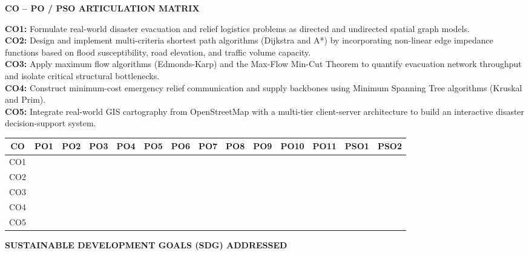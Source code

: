 \documentclass[12pt,oneside]{report}
\begin{document}
\thispagestyle{plain}
\begin{center}
\vspace{0.05in}
{\large\bfseries CO -- PO / PSO ARTICULATION MATRIX}
\end{center}
\textbf{CO1:} Formulate real-world disaster evacuation and relief logistics problems as directed and undirected spatial graph models.\\
\textbf{CO2:} Design and implement multi-criteria shortest path algorithms (Dijkstra and A*) by incorporating non-linear edge impedance functions based on flood susceptibility, road elevation, and traffic volume capacity.\\
\textbf{CO3:} Apply maximum flow algorithms (Edmonds-Karp) and the Max-Flow Min-Cut Theorem to quantify evacuation network throughput and isolate critical structural bottlenecks.\\
\textbf{CO4:} Construct minimum-cost emergency relief communication and supply backbones using Minimum Spanning Tree algorithms (Kruskal and Prim).\\
\textbf{CO5:} Integrate real-world GIS cartography from OpenStreetMap with a multi-tier client-server architecture to build an interactive disaster decision-support system.

\begin{center}
\begin{tabular}{|c|*{11}{c|}c|c|}
\hline
\textbf{CO}
& \textbf{PO1} & \textbf{PO2} & \textbf{PO3}
& \textbf{PO4} & \textbf{PO5} & \textbf{PO6}
& \textbf{PO7} & \textbf{PO8} & \textbf{PO9}
& \textbf{PO10} & \textbf{PO11}
& \textbf{PSO1} & \textbf{PSO2} \\ \hline

CO1 &  &  &  &  &  &  &  &  &  &  &  &  &  \\ \hline
CO2 &  &  &  &  &  &  &  &  &  &  &  &  &  \\ \hline
CO3 &  &  &  &  &  &  &  &  &  &  &  &  &  \\ \hline
CO4 &  &  &  &  &  &  &  &  &  &  &  &  &  \\ \hline
CO5 &  &  &  &  &  &  &  &  &  &  &  &  &  \\ \hline
\end{tabular}
\end{center}

\vspace{0.15in}
\begin{center}
    {\large\bfseries SUSTAINABLE DEVELOPMENT GOALS (SDG) ADDRESSED}
\end{center}
\end{document}
